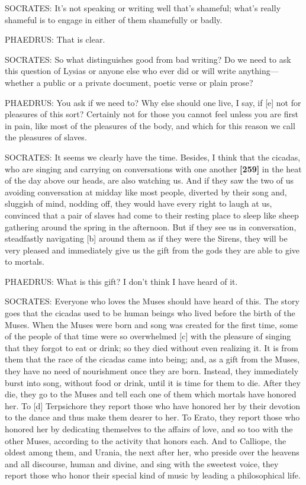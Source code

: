 SOCRATES: It's not speaking or writing well that's shameful; what's
really shameful is to engage in either of them shamefully or badly.

PHAEDRUS: That is clear.

SOCRATES: So what distinguishes good from bad writing? Do we need to ask
this question of Lysias or anyone else who ever did or will write
anything---whether a public or a private document, poetic verse or plain
prose?

PHAEDRUS: You ask if we need to? Why else should one live, I say, if
{[}e{]} not for pleasures of this sort? Certainly not for those you
cannot feel unless you are first in pain, like most of the pleasures of
the body, and which for this reason we call the pleasures of slaves.

SOCRATES: It seems we clearly have the time. Besides, I think that the
cicadas, who are singing and carrying on conversations with one another
{\bf {[}259{]}} in the heat of the day above our heads, are also
watching us. And if they saw the two of us avoiding conversation at
midday like most people, diverted by their song and, sluggish of mind,
nodding off, they would have every right to laugh at us, convinced that
a pair of slaves had come to their resting place to sleep like sheep
gathering around the spring in the afternoon. But if they see us in
conversation, steadfastly navigating {[}b{]} around them as if they were
the Sirens, they will be very pleased and immediately give us the gift
from the gods they are able to give to mortals.

PHAEDRUS: What is this gift? I don't think I have heard of it.

SOCRATES: Everyone who loves the Muses should have heard of this. The
story goes that the cicadas used to be human beings who lived before the
birth of the Muses. When the Muses were born and song was created for
the first time, some of the people of that time were so overwhelmed
{[}c{]} with the pleasure of singing that they forgot to eat or drink;
so they died without even realizing it. It is from them that the race of
the cicadas came into being; and, as a gift from the Muses, they have no
need of nourishment once they are born. Instead, they immediately burst
into song, without food or drink, until it is time for them to die.
After they die, they go to the Muses and tell each one of them which
mortals have honored her. To {[}d{]} Terpsichore they report those who
have honored her by their devotion to the dance and thus make them
dearer to her. To Erato, they report those who honored her by dedicating
themselves to the affairs of love, and so too with the other Muses,
according to the activity that honors each. And to Calliope, the oldest
among them, and Urania, the next after her, who preside over the heavens
and all discourse, human and divine, and sing with the sweetest voice,
they report those who honor their special kind of music by leading a
philosophical life.

